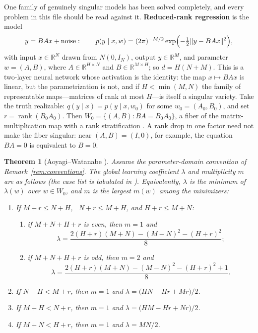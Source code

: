 \documentclass[11pt]{amsart}
\theoremstyle{plain}
\newtheorem{theorem}{Theorem}[section]
\theoremstyle{definition}
\newcommand{\R}{\mathbb{R}}
\DeclareMathOperator{\rank}{rank}
\begin{document}
One family of genuinely singular models has been solved completely, and every problem in this file should be read against it. \textbf{Reduced-rank regression} is the model
\[
   y = BAx + \text{noise}: \qquad
   p(y \mid x, w) = (2\pi)^{-M/2} \exp\Bigl(-\tfrac12 \| y - BAx \|^2\Bigr),
\]
with input $x \in \R^N$ drawn from $N(0, I_N)$, output $y \in \R^M$, and parameter $w = (A, B)$, where $A \in \R^{H \times N}$ and $B \in \R^{M \times H}$; so $d = H(N + M)$. This is a two-layer neural network whose activation is the identity: the map $x \mapsto BAx$ is linear, but the parametrization is not, and if $H < \min(M,N)$ the family of representable maps---matrices of rank at most $H$---is itself a singular variety. Take the truth realizable: $q(y \mid x) = p(y \mid x, w_0)$ for some $w_0 = (A_0, B_0)$, and set $r = \rank(B_0 A_0)$. Then $W_0 = \{(A,B) : BA = B_0 A_0\}$, a fiber of the matrix-multiplication map with a rank stratification \cite{lehalleur2024}. A rank drop in one factor need not make the fiber singular: near $(A,B)=(I,0)$, for example, the equation $BA=0$ is equivalent to $B=0$.

\begin{theorem}[Aoyagi--Watanabe \cite{aoyagi2005}]\label{thm:aw}
Assume the parameter-domain convention of Remark~\textup{\ref{rem:conventions}}. The global learning coefficient $\lambda$ and multiplicity $m$ are as follows (the case list is tabulated in {\cite[Thm.~3.5]{ogden2026}}). Equivalently, $\lambda$ is the minimum of $\lambda(w)$ over $w\in W_0$, and $m$ is the largest $m(w)$ among the minimizers\textup{:}
\begin{enumerate}
\item If $M + r \le N + H$, \ $N + r \le M + H$, and $H + r \le M + N$\textup{:}
  \begin{enumerate}
  \item if $M + N + H + r$ is even, then $m = 1$ and
  \[
     \lambda = \frac{2(H+r)(M+N) - (M-N)^2 - (H+r)^2}{8};
  \]
  \item if $M + N + H + r$ is odd, then $m = 2$ and
  \[
     \lambda = \frac{2(H+r)(M+N) - (M-N)^2 - (H+r)^2 + 1}{8}.
  \]
  \end{enumerate}
\item If $N + H < M + r$, then $m = 1$ and $\lambda = \bigl(HN - Hr + Mr\bigr)/2$.
\item If $M + H < N + r$, then $m = 1$ and $\lambda = \bigl(HM - Hr + Nr\bigr)/2$.
\item If $M + N < H + r$, then $m = 1$ and $\lambda = MN/2$.
\end{enumerate}
\end{theorem}
\end{document}
